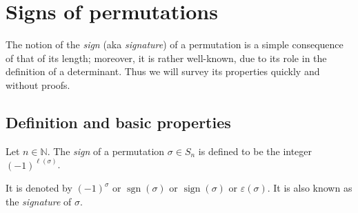 \section{Signs of permutations}

The notion of the \emph{sign} (aka \emph{signature}) of a permutation is a
simple consequence of that of its length; moreover, it is rather well-known,
due to its role in the definition of a determinant. Thus we will survey its
properties quickly and without proofs.

\subsection{Definition and basic properties}

\begin{definition}
\label{def.perm.sign}
\leantarget
\leanok
Let $n \in \mathbb{N}$. The \emph{sign} of a permutation
$\sigma \in S_n$ is defined to be the integer $(-1)^{\ell(\sigma)}$.

It is denoted by $(-1)^{\sigma}$ or $\operatorname{sgn}(\sigma)$ or
$\operatorname{sign}(\sigma)$ or $\varepsilon(\sigma)$. It is also known
as the \emph{signature} of $\sigma$.
\end{definition}

